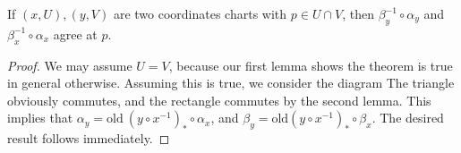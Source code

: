 \begin{lemma}
    If $(x,U), (y,V)$ are two coordinates charts with $p \in U \cap V$, then $\beta_y^{-1} \circ \alpha_y$ and $\beta_x^{-1} \circ \alpha_x$ agree at $p$.
\end{lemma}
\begin{proof}
    We may assume $U = V$, because our first lemma shows the theorem is true in general otherwise. Assuming this is true, we consider the diagram
    The triangle obviously commutes, and the rectangle commutes by the second lemma. This implies that $\alpha_y = \text{old}\ (y \circ x^{-1})_* \circ \alpha_x$, and $\beta_y = \text{old}(y \circ x^{-1})_* \circ \beta_x$. The desired result follows immediately.
\end{proof}

